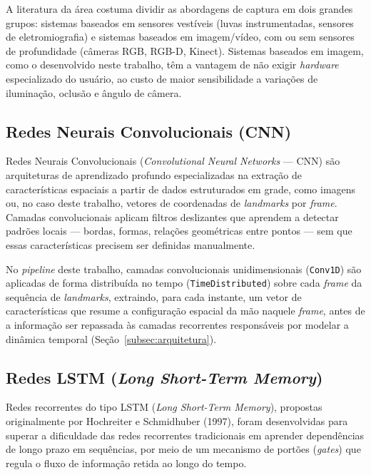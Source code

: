A literatura da área costuma dividir as abordagens de captura em dois grandes
grupos: sistemas baseados em sensores vestíveis (luvas instrumentadas, sensores
de eletromiografia) e sistemas baseados em imagem/vídeo, com ou sem sensores de
profundidade (câmeras RGB, RGB-D, Kinect). Sistemas baseados em imagem, como o
desenvolvido neste trabalho, têm a vantagem de não exigir \textit{hardware}
especializado do usuário, ao custo de maior sensibilidade a variações de
iluminação, oclusão e ângulo de câmera.

\subsection{Redes Neurais Convolucionais (CNN)}
\label{subsec:cnn}

Redes Neurais Convolucionais (\textit{Convolutional Neural Networks} — CNN) são
arquiteturas de aprendizado profundo especializadas na extração de
características espaciais a partir de dados estruturados em grade, como imagens
ou, no caso deste trabalho, vetores de coordenadas de \textit{landmarks} por
\textit{frame}. Camadas convolucionais aplicam filtros deslizantes que aprendem a
detectar padrões locais — bordas, formas, relações geométricas entre pontos —
sem que essas características precisem ser definidas manualmente.

No \textit{pipeline} deste trabalho, camadas convolucionais unidimensionais
(\texttt{Conv1D}) são aplicadas de forma distribuída no tempo
(\texttt{TimeDistributed}) sobre cada \textit{frame} da sequência de
\textit{landmarks}, extraindo, para cada instante, um vetor de características que
resume a configuração espacial da mão naquele \textit{frame}, antes de a
informação ser repassada às camadas recorrentes responsáveis por modelar a
dinâmica temporal (Seção~\ref{subsec:arquitetura}).

\subsection{Redes LSTM (\textit{Long Short-Term Memory})}
\label{subsec:lstm}

Redes recorrentes do tipo LSTM (\textit{Long Short-Term Memory}), propostas
originalmente por Hochreiter e Schmidhuber (1997), foram desenvolvidas para
superar a dificuldade das redes recorrentes tradicionais em aprender dependências
de longo prazo em sequências, por meio de um mecanismo de portões
(\textit{gates}) que regula o fluxo de informação retida ao longo do tempo.

